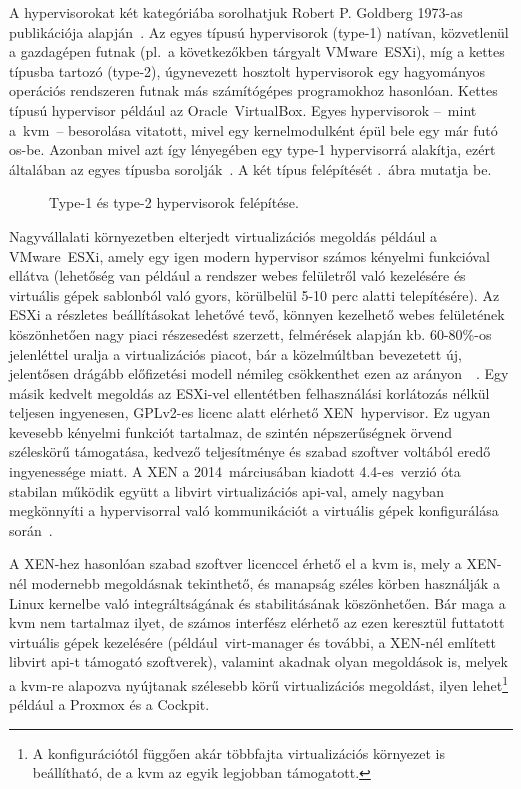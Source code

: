 A \gls{hypervisor}okat két kategóriába sorolhatjuk Robert P. Goldberg 1973-as publikációja alapján~\cite{Goldberg1973Hypervisors}. Az egyes típusú hypervisorok \mbox{(type-1)} natívan, közvetlenül a gazdagépen futnak (pl.~a következőkben tárgyalt VMware~ESXi), míg a kettes típusba tartozó \mbox{(type-2)}, úgynevezett hosztolt hypervisorok egy hagyományos operációs rendszeren futnak más számítógépes programokhoz hasonlóan. Kettes típusú hypervisor például az Oracle~\mbox{VirtualBox}. Egyes hypervisorok --~mint a~\acrshort{kvm}~-- besorolása vitatott, mivel egy kernelmodulként épül bele egy már futó \acrshort{os}-be. Azonban mivel azt így lényegében egy type-1 \gls{hypervisor}rá alakítja, ezért általában az egyes típusba sorolják~\cite{WikiHypervisor}. A két típus felépítését .~ábra mutatja be.

\begin{figure}[ht]
	\centering
	
	\caption{Type-1 és type-2 \gls{hypervisor}ok felépítése.}
	\label{fig:hypervisors}
\end{figure}

Nagyvállalati környezetben elterjedt virtualizációs megoldás például a VMware~ESXi, amely egy igen modern \gls{hypervisor} számos kényelmi funkcióval ellátva (lehetőség van például a rendszer webes felületről való kezelésére és virtuális gépek sablonból való gyors, körülbelül 5-10 perc alatti telepítésére). Az ESXi a részletes beállításokat lehetővé tevő, könnyen kezelhető webes felületének köszönhetően nagy piaci részesedést szerzett, felmérések alapján kb. 60-80\%-os jelenléttel uralja a virtualizációs piacot, bár a közelmúltban bevezetett új, jelentősen drágább előfizetési modell némileg csökkenthet ezen az arányon~\cite{VmwareMarketshare}~\cite{VmwareCustomerDecline}.
Egy másik kedvelt megoldás az ESXi-vel ellentétben felhasználási korlátozás nélkül teljesen ingyenesen, GPLv2-es licenc alatt elérhető XEN~\gls{hypervisor}. Ez ugyan kevesebb kényelmi funkciót tartalmaz, de szintén népszerűségnek örvend széleskörű támogatása, kedvező teljesítménye és szabad szoftver voltából eredő ingyenessége miatt. A XEN a 2014~márciusában kiadott 4.4-es~verzió óta stabilan működik együtt a \gls{libvirt} virtualizációs \acrshort{api}-val, amely nagyban megkönnyíti a \gls{hypervisor}ral való kommunikációt a virtuális gépek konfigurálása során~\cite{Xen44ReleaseNotes}.

A XEN-hez hasonlóan szabad szoftver licenccel érhető el a \acrfull{kvm} is, mely a XEN-nél modernebb megoldásnak tekinthető, és manapság széles körben használják a Linux kernelbe való integráltságának és stabilitásának köszönhetően. Bár maga a \acrshort{kvm} nem tartalmaz ilyet, de számos interfész elérhető az ezen keresztül futtatott virtuális gépek kezelésére (például~virt-manager és további, a XEN-nél említett \gls{libvirt} \acrshort{api}-t támogató  szoftverek), valamint akadnak olyan megoldások is, melyek a \acrshort{kvm}-re alapozva nyújtanak szélesebb körű virtualizációs megoldást, ilyen lehet\footnote{A konfigurációtól függően akár többfajta virtualizációs környezet is beállítható, de a \acrshort{kvm} az egyik legjobban támogatott.} például a Proxmox és a Cockpit.

